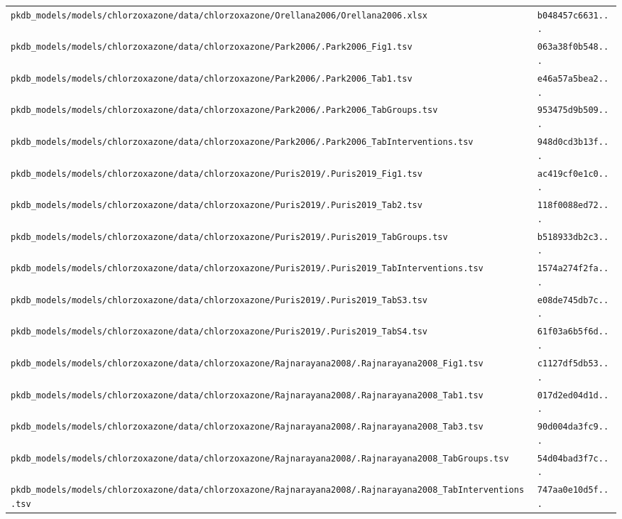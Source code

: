 \documentclass{article}
\begin{document}
\begin{longtable}{ll}
\texttt{pkdb\_models/models/chlorzoxazone/data/chlorzoxazone/Orellana2006/Orellana2006.xlsx} & \texttt{b048457c6631...} \\
\texttt{pkdb\_models/models/chlorzoxazone/data/chlorzoxazone/Park2006/.Park2006\_Fig1.tsv} & \texttt{063a38f0b548...} \\
\texttt{pkdb\_models/models/chlorzoxazone/data/chlorzoxazone/Park2006/.Park2006\_Tab1.tsv} & \texttt{e46a57a5bea2...} \\
\texttt{pkdb\_models/models/chlorzoxazone/data/chlorzoxazone/Park2006/.Park2006\_TabGroups.tsv} & \texttt{953475d9b509...} \\
\texttt{pkdb\_models/models/chlorzoxazone/data/chlorzoxazone/Park2006/.Park2006\_TabInterventions.tsv} & \texttt{948d0cd3b13f...} \\
\texttt{pkdb\_models/models/chlorzoxazone/data/chlorzoxazone/Puris2019/.Puris2019\_Fig1.tsv} & \texttt{ac419cf0e1c0...} \\
\texttt{pkdb\_models/models/chlorzoxazone/data/chlorzoxazone/Puris2019/.Puris2019\_Tab2.tsv} & \texttt{118f0088ed72...} \\
\texttt{pkdb\_models/models/chlorzoxazone/data/chlorzoxazone/Puris2019/.Puris2019\_TabGroups.tsv} & \texttt{b518933db2c3...} \\
\texttt{pkdb\_models/models/chlorzoxazone/data/chlorzoxazone/Puris2019/.Puris2019\_TabInterventions.tsv} & \texttt{1574a274f2fa...} \\
\texttt{pkdb\_models/models/chlorzoxazone/data/chlorzoxazone/Puris2019/.Puris2019\_TabS3.tsv} & \texttt{e08de745db7c...} \\
\texttt{pkdb\_models/models/chlorzoxazone/data/chlorzoxazone/Puris2019/.Puris2019\_TabS4.tsv} & \texttt{61f03a6b5f6d...} \\
\texttt{pkdb\_models/models/chlorzoxazone/data/chlorzoxazone/Rajnarayana2008/.Rajnarayana2008\_Fig1.tsv} & \texttt{c1127df5db53...} \\
\texttt{pkdb\_models/models/chlorzoxazone/data/chlorzoxazone/Rajnarayana2008/.Rajnarayana2008\_Tab1.tsv} & \texttt{017d2ed04d1d...} \\
\texttt{pkdb\_models/models/chlorzoxazone/data/chlorzoxazone/Rajnarayana2008/.Rajnarayana2008\_Tab3.tsv} & \texttt{90d004da3fc9...} \\
\texttt{pkdb\_models/models/chlorzoxazone/data/chlorzoxazone/Rajnarayana2008/.Rajnarayana2008\_TabGroups.tsv} & \texttt{54d04bad3f7c...} \\
\texttt{pkdb\_models/models/chlorzoxazone/data/chlorzoxazone/Rajnarayana2008/.Rajnarayana2008\_TabInterventions.tsv} & \texttt{747aa0e10d5f...} \\

\end{longtable}
\end{document}
